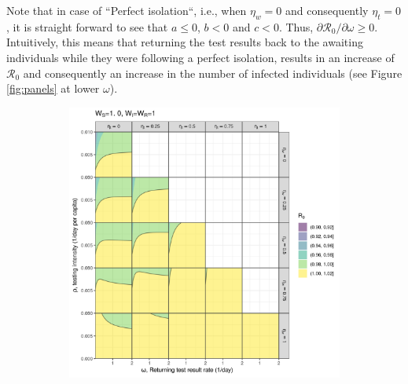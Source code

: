 \documentclass{article}
\newcommand{\Rnum}{\mathcal{R}_0}
\theoremstyle{definition} %
\begin{document}
 
Note that in case of ``Perfect isolation``, i.e., when $\eta_w=0$ and consequently $\eta_t=0$, it is straight forward to see that $a \leq 0$, $b<0$ and $c<0$. Thus, $\partial{\Rnum}/\partial{\omega} \geq 0$. Intuitively, this means that returning the test results back to the awaiting individuals while they were following a perfect isolation, results in an increase of $\Rnum$ and consequently an increase in the number of infected individuals (see Figure \ref{fig:panels} at lower $\omega$).




\begin{figure}[h!]
\centering
\begin{subfigure}[t]{.45\textwidth}
\centering
\includegraphics[width=\linewidth]{./pix/R0contour_random.png}
\end{subfigure}
%
\begin{subfigure}[t]{.45\textwidth}
\centering

\end{subfigure}
\end{figure}
\end{document}
